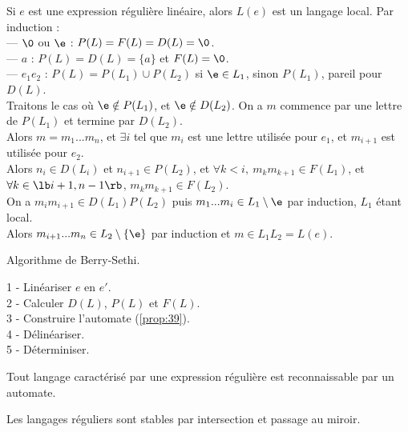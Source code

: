 \documentclass[french, 11pt]{article}
\begin{document}
\begin{prop}{}{}
    Si $e$ est une expression régulière linéaire, alors $L(e)$ est un langage local.
    \tcblower
    Par induction :\\
    --- $\0$ ou $\e$ : $P(L)=F(L)=D(L)=\0$.\\
    --- $a$ : $P(L)=D(L)=\{a\}$ et $F(L)=\0$.\\
    --- $e_1e_2$ : $P(L)=P(L_1)\cup P(L_2)$ si $\e\in L_1$, sinon $P(L_1)$, pareil pour $D(L)$.\\
    Traitons le cas où $\e \notin P(L_1)$, et $\e\notin D(L_2)$. On a $m$ commence par une lettre de $P(L_1)$ et termine par $D(L_2)$.\\
    Alors $m=m_1...m_n$, et $\exists i$ tel que $m_i$ est une lettre utilisée pour $e_1$, et $m_{i+1}$ est utilisée pour $e_2$.\\
    Alors $n_i \in D(L_i)$ et $n_{i+1}\in P(L_2)$, et $\forall k < i, ~ m_km_{k+1}\in F(L_1)$, et $\forall k \in \lb i+1,n-1\rb$, $m_km_{k+1} \in F(L_2)$.\\
    On a $m_im_{i+1}\in D(L_1)P(L_2)$ puis $m_1...m_i \in L_1 \setminus{\e}$ par induction, $L_1$ étant local.\\
    Alors $m_{i+1}...m_n \in L_2\setminus\{\e\}$ par induction et $m\in L_1L_2=L(e)$. 
\end{prop}

\begin{defi}{Algorithme de Berry-Sethi.}{}
    \begin{algorithm}[H]
        \caption{Algorithme de Berry-Sethi.}
        1 - Linéariser $e$ en $e'$.\\
        2 - Calculer $D(L)$, $P(L)$ et $F(L)$.\\
        3 - Construire l'automate (\ref{prop:39}).\\
        4 - Délinéariser.\\
        5 - Déterminiser.
    \end{algorithm}
\end{defi}

\begin{corr}{}{}
    Tout langage caractérisé par une expression régulière est reconnaissable par un automate.
\end{corr}

\begin{corr}{}{}
    Les langages réguliers sont stables par intersection et passage au miroir.
\end{corr}
\end{document}
